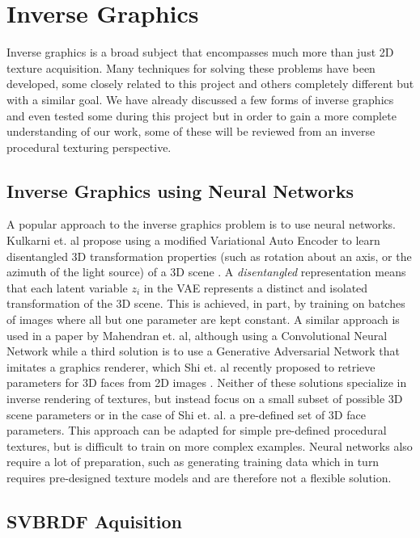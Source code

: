 \section{Inverse Graphics}\label{sec:BackgroundInverseGraphics}
Inverse graphics is a broad subject that encompasses much more than just 2D texture acquisition. Many techniques for solving these problems have been developed, some closely related to this project and others completely different but with a similar goal. We have already discussed a few forms of inverse graphics and even tested some during this project but in order to gain a more complete understanding of our work, some of these will be reviewed from an inverse procedural texturing perspective.

\subsection{Inverse Graphics using Neural Networks}

A popular approach to the inverse graphics problem is to use neural networks. Kulkarni et. al propose using a modified Variational Auto Encoder to learn disentangled 3D transformation properties (such as rotation about an axis, or the azimuth of the light source) of a 3D scene \cite{kulkarni_2015_deep}. A \textit{disentangled} representation means that each latent variable $z_i$ in the VAE represents a distinct and isolated transformation of the 3D scene. This is achieved, in part, by training on batches of images where all but one parameter are kept constant. A similar approach is used in a paper by Mahendran et. al, although using a Convolutional Neural Network \cite{mahendran_2017_3d} while a third solution is to use a Generative Adversarial Network that imitates a graphics renderer, which Shi et. al recently proposed to retrieve parameters for 3D faces from 2D images \cite{shi_2019_facetoparameter}. Neither of these solutions specialize in inverse rendering of textures, but instead focus on a small subset of possible 3D scene parameters or in the case of Shi et. al. a pre-defined set of 3D face parameters. This approach can be adapted for simple pre-defined procedural textures, but is difficult to train on more complex examples. Neural networks also require a lot of preparation, such as generating training data which in turn requires pre-designed texture models and are therefore not a flexible solution.

\subsection{SVBRDF Aquisition}


